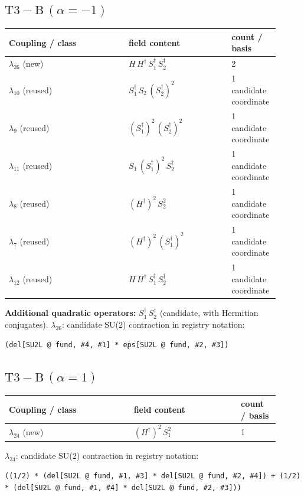 \documentclass[9pt,a4paper]{article}
\begin{document}
\subsection*{$ \mathrm{T3-B}\,(\alpha=-1) $}
\begin{longtable}{@{}p{0.42\linewidth}p{0.36\linewidth}p{0.13\linewidth}@{}}
\toprule
Coupling / class & field content & count / basis\\
\midrule
\endhead
$\lambda_{26}$ (new) & $H\, H^\dagger\, S_1^\dagger\, S_2^\dagger$ & 2 \\
$\lambda_{10}$ (reused) & $S_1^\dagger\, S_2\, \left(S_2^\dagger\right)^{2}$ & 1 candidate coordinate \\
$\lambda_{9}$ (reused) & $\left(S_1^\dagger\right)^{2}\, \left(S_2^\dagger\right)^{2}$ & 1 candidate coordinate \\
$\lambda_{11}$ (reused) & $S_1\, \left(S_1^\dagger\right)^{2}\, S_2^\dagger$ & 1 candidate coordinate \\
$\lambda_{8}$ (reused) & $\left(H^\dagger\right)^{2}\, S_2^{2}$ & 1 candidate coordinate \\
$\lambda_{7}$ (reused) & $\left(H^\dagger\right)^{2}\, \left(S_1^\dagger\right)^{2}$ & 1 candidate coordinate \\
$\lambda_{12}$ (reused) & $H\, H^\dagger\, S_1^\dagger\, S_2^\dagger$ & 1 candidate coordinate \\
\bottomrule
\end{longtable}
\textbf{Additional quadratic operators:}
$S_1^\dagger\, S_2^\dagger$ (candidate, with Hermitian conjugates).
\textbf{$ \lambda_{26} $}: candidate SU(2) contraction in registry notation:
\begin{lstlisting}[mathescape=true]
(del[SU2L @ fund, #4, #1] * eps[SU2L @ fund, #2, #3])
\end{lstlisting}

\subsection*{$ \mathrm{T3-B}\,(\alpha=1) $}
\begin{longtable}{@{}p{0.42\linewidth}p{0.36\linewidth}p{0.13\linewidth}@{}}
\toprule
Coupling / class & field content & count / basis\\
\midrule
\endhead
$\lambda_{24}$ (new) & $\left(H^\dagger\right)^{2}\, S_1^{2}$ & 1 \\
\bottomrule
\end{longtable}
\textbf{$ \lambda_{24} $}: candidate SU(2) contraction in registry notation:
\begin{lstlisting}[mathescape=true]
((1/2) * (del[SU2L @ fund, #1, #3] * del[SU2L @ fund, #2, #4]) + (1/2) * (del[SU2L @ fund, #1, #4] * del[SU2L @ fund, #2, #3]))
\end{lstlisting}
\end{document}
